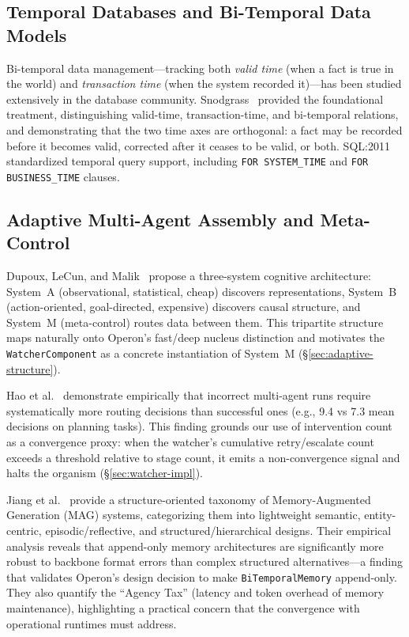 \subsection{Temporal Databases and Bi-Temporal Data Models}

Bi-temporal data management---tracking both \emph{valid time} (when a fact is true in the world) and \emph{transaction time} (when the system recorded it)---has been studied extensively in the database community. Snodgrass~\cite{snodgrass2000temporal} provided the foundational treatment, distinguishing valid-time, transaction-time, and bi-temporal relations, and demonstrating that the two time axes are orthogonal: a fact may be recorded before it becomes valid, corrected after it ceases to be valid, or both. SQL:2011~\cite{kulkarni2012temporal} standardized temporal query support, including \texttt{FOR SYSTEM\_TIME} and \texttt{FOR BUSINESS\_TIME} clauses.

\subsection{Adaptive Multi-Agent Assembly and Meta-Control}

Dupoux, LeCun, and Malik~\cite{dupoux2026learning} propose a three-system cognitive architecture: System~A (observational, statistical, cheap) discovers representations, System~B (action-oriented, goal-directed, expensive) discovers causal structure, and System~M (meta-control) routes data between them. This tripartite structure maps naturally onto Operon's fast/deep nucleus distinction and motivates the \texttt{WatcherComponent} as a concrete instantiation of System~M (\S\ref{sec:adaptive-structure}).

Hao et al.~\cite{hao2026bigmas} demonstrate empirically that incorrect multi-agent runs require systematically more routing decisions than successful ones (e.g., 9.4 vs 7.3 mean decisions on planning tasks). This finding grounds our use of intervention count as a convergence proxy: when the watcher's cumulative retry/escalate count exceeds a threshold relative to stage count, it emits a non-convergence signal and halts the organism (\S\ref{sec:watcher-impl}).

Jiang et al.~\cite{jiang2026anatomy} provide a structure-oriented taxonomy of Memory-Augmented Generation (MAG) systems, categorizing them into lightweight semantic, entity-centric, episodic/reflective, and structured/hierarchical designs. Their empirical analysis reveals that append-only memory architectures are significantly more robust to backbone format errors than complex structured alternatives---a finding that validates Operon's design decision to make \texttt{BiTemporalMemory} append-only. They also quantify the ``Agency Tax'' (latency and token overhead of memory maintenance), highlighting a practical concern that the convergence with operational runtimes must address.

